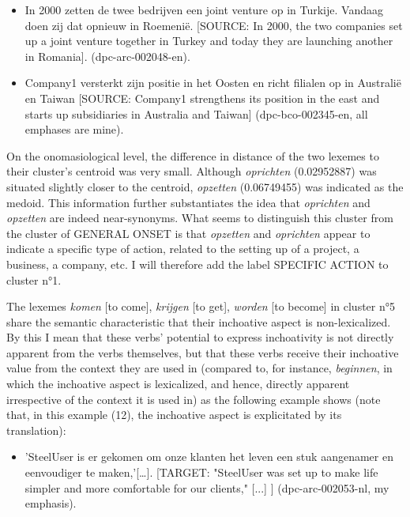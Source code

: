 \begin{itemize}
\item \begin{styleVoorbeeld}
In 2000 zetten de twee bedrijven een joint venture op in Turkije. Vandaag doen zij dat opnieuw in Roemenië. [SOURCE: In 2000, the two companies set up a joint venture together in Turkey and today they are launching another in Romania]. (dpc-arc-002048-en).
\end{styleVoorbeeld}
\item \begin{styleVoorbeeld}
Company1 versterkt zijn positie in het Oosten en richt filialen op in Australië en Taiwan [SOURCE: Company1 strengthens its position in the east and starts up subsidiaries in Australia and Taiwan] (dpc-bco-002345-en, all emphases are mine).
\end{styleVoorbeeld}
\end{itemize}

On the onomasiological level, the difference in distance of the two lexemes to their cluster’s centroid was very small. Although \textit{oprichten} (0.02952887) was situated slightly closer to the centroid, \textit{opzetten} (0.06749455) was indicated as the medoid. This information further substantiates the idea that \textit{oprichten} and \textit{opzetten} are indeed near-synonyms. What seems to distinguish this cluster from the cluster of GENERAL ONSET is that \textit{opzetten} and \textit{oprichten} appear to indicate a specific type of action, related to the setting up of a project, a business, a company, etc. I will therefore add the label SPECIFIC ACTION to cluster n°1.

The lexemes \textit{komen} [to come], \textit{krijgen} [to get], \textit{worden} [to become] in cluster n°5 share the semantic characteristic that their inchoative aspect is non-lexicalized. By this I mean that these verbs’ potential to express inchoativity is not directly apparent from the verbs themselves, but that these verbs receive their inchoative value from the context they are used in (compared to, for instance, \textit{beginnen}, in which the inchoative aspect is lexicalized, and hence, directly apparent irrespective of the context it is used in) as the following example shows (note that, in this example (12), the inchoative aspect is explicitated by its translation):

\begin{itemize}
\item \begin{styleVoorbeeld}
'SteelUser is er gekomen om onze klanten het leven een stuk aangenamer en eenvoudiger te maken,'[…]. [TARGET: "SteelUser was set up to make life simpler and more comfortable for our clients," [...] ] (dpc-arc-002053-nl, my emphasis).
\end{styleVoorbeeld}
\end{itemize}

